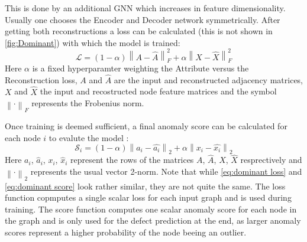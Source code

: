 \documentclass[11pt,a4paper]{article}
\begin{document}
This is done by an additional GNN which increases in feature dimensionality. 
Usually one chooses the Encoder and Decoder network symmetrically. 
After getting both reconstructions a loss can be calculated (this is not shown in \autoref{fig:Dominant}) with which the model is trained\cite{dingDeepAnomalyDetection2019}:
\begin{equation}
    \label{eq:dominant loss}
    \mathcal{L} = (1-\alpha) \left\lVert A-\hat{A} \right\rVert _F^2 + \alpha  \left\lVert X-\hat{X} \right\rVert _F^2
\end{equation}
Here $\alpha$ is a fixed hyperparamter weighting the Attribute versus the Reconstruction loss, $A$ and $\hat{A}$ are the input and reconstructed adjacency matrices, $X$ and $\hat{X}$ the input and recostructed node feature matrices and the symbol $\left\lVert\cdot  \right\rVert _F$ represents the Frobenius norm. 

Once training is deemed sufficient, a final anomaly score can be calculated for each node $i$ to evalute the model \cite{dingDeepAnomalyDetection2019}:
\begin{equation}
    \label{eq:dominant score}
    \mathcal{S}_i = (1-\alpha) \left\lVert a_i-\hat{a_i} \right\rVert _2 + \alpha  \left\lVert x_i-\hat{x_i} \right\rVert _2
\end{equation}
Here $a_i$, $\hat{a}_i$, $x_i$, $\hat{x}_i$ represent the rows of the matrices $A$, $\hat{A}$, $X$, $\hat{X}$ resprectively and $\left\lVert\cdot  \right\rVert _2$ represents the usual vector 2-norm. 
Note that while \autoref{eq:dominant loss} and \autoref{eq:dominant score} look rather similar, they are not quite the same. 
The loss function copmputes a single scalar loss for each input graph and is used during training. 
The score function computes one scalar anomaly score for each node in the graph and is only used for the defect prediction at the end, as larger anomaly scores represent a higher probability of the node beeing an outlier. 
\end{document}
